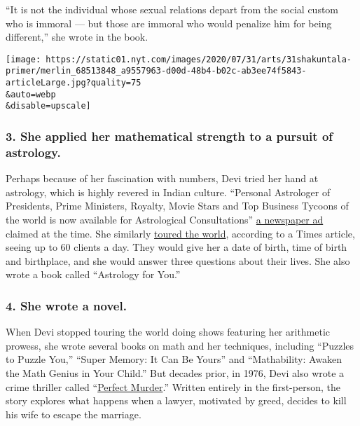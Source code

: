 ``It is not the individual whose sexual relations depart from the social
custom who is immoral --- but those are immoral who would penalize him
for being different,'' she wrote in the book.

\texttt{[image: https://static01.nyt.com/images/2020/07/31/arts/31shakuntala-primer/merlin\_68513848\_a9557963-d00d-48b4-b02c-ab3ee74f5843-articleLarge.jpg?quality=75\\\&auto=webp\\\&disable=upscale]}

\hypertarget{3-she-applied-her-mathematical-strength-to-a-pursuit-of-astrology}{%
\subsubsection{\texorpdfstring{\textbf{3. She applied her mathematical
strength to a pursuit of
astrology.}}{3. She applied her mathematical strength to a pursuit of astrology.}}\label{3-she-applied-her-mathematical-strength-to-a-pursuit-of-astrology}}

Perhaps because of her fascination with numbers, Devi tried her hand at
astrology, which is highly revered in Indian culture. ``Personal
Astrologer of Presidents, Prime Ministers, Royalty, Movie Stars and Top
Business Tycoons of the world is now available for Astrological
Consultations''
\href{https://www.infoqueenbee.com/2013/11/biography-of-human-computer-shakunthala.html}{a
newspaper ad} claimed at the time. She similarly
\href{https://www.nytimes.com/news/the-lives-they-lived/2013/12/21/shakuntala-devi/}{toured
the world}, according to a Times article, seeing up to 60 clients a day.
They would give her a date of birth, time of birth and birthplace, and
she would answer three questions about their lives. She also wrote a
book called ``Astrology for You.''

\hypertarget{4-she-wrote-a-novel}{%
\subsubsection{\texorpdfstring{\textbf{4. She wrote a
novel.}}{4. She wrote a novel.}}\label{4-she-wrote-a-novel}}

When Devi stopped touring the world doing shows featuring her arithmetic
prowess, she wrote several books on math and her techniques, including
``Puzzles to Puzzle You,'' ``Super Memory: It Can Be Yours'' and
``Mathability: Awaken the Math Genius in Your Child.'' But decades
prior, in 1976, Devi also wrote a crime thriller called
``\href{https://www.goodreads.com/book/show/18212970-perfect-murder}{Perfect
Murder}.'' Written entirely in the first-person, the story explores what
happens when a lawyer, motivated by greed, decides to kill his wife to
escape the marriage.


